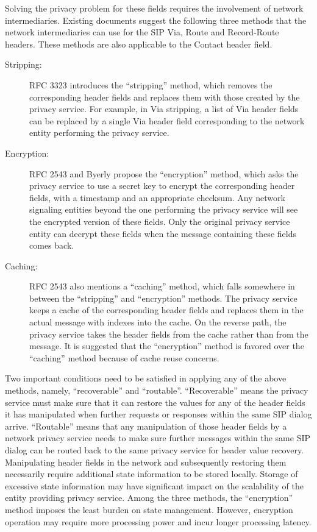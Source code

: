 \documentclass[letterpaper,notitlepage,times,12pt]{article}
\begin{document}
Solving the privacy problem for these fields requires the involvement of network intermediaries. Existing documents suggest the following three methods that the network intermediaries can use for the SIP {\sf Via}, {\sf Route} and {\sf Record-Route} headers. These methods are also applicable to the {\sf Contact} header field.

\begin{description}
\item [Stripping:] RFC 3323 introduces the ``stripping'' method, which removes the corresponding header fields and replaces them with those created by the privacy service. For example, in {\sf Via} stripping, a list of {\sf Via} header fields can be replaced by a single {\sf Via} header field corresponding to the network entity performing the privacy service.
\item [Encryption:] RFC 2543 and Byerly\cite{siphideroute} propose the ``encryption'' method, which asks the privacy service to use a secret key to encrypt the corresponding header fields, with a timestamp and an appropriate checksum. Any network signaling entities beyond the one performing the privacy service will see the encrypted version of these fields. Only the original privacy service entity can decrypt these fields when the message containing these fields comes back.
\item [Caching:] RFC 2543 also mentions a ``caching'' method, which falls somewhere in between the ``stripping'' and ``encryption'' methods. The privacy service keeps a cache of the corresponding header fields and replaces them in the actual message with indexes into the cache. On the reverse path, the privacy service takes the header fields from the cache rather than from the message. It is suggested that the ``encryption'' method is favored over the ``caching'' method because of cache reuse concerns.
\end{description}

Two important conditions need to be satisfied in applying any of the above methods, namely, ``recoverable'' and ``routable''. ``Recoverable'' means the privacy service must make sure that it can restore the values for any of the header fields it has manipulated when further requests or responses within the same SIP dialog arrive. ``Routable'' means that any manipulation of those header fields by a network privacy service needs to make sure further messages within the same SIP dialog can be routed back to the same privacy service for header value recovery. Manipulating header fields in the network and subsequently restoring them necessarily require additional state information to be stored locally. Storage of excessive state information may have significant impact on the scalability of the entity providing privacy service. Among the three methods, the ``encryption'' method imposes the least burden on state management. However, encryption operation may require more processing power and incur longer processing latency.
\end{document}
